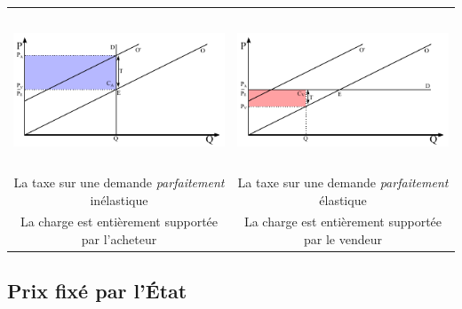 \begin{center}
\begin{tabular}{cc}
		\rule[-0.9cm]{0cm}{0.5cm}\\
		
		\includegraphics[height=4.5cm]{images/graph_taxe_demande_parfaitement_inelastique.pdf} & \includegraphics[height=4.5cm]{images/graph_taxe_demande_parfaitement_elastique.pdf}\\
		La taxe sur une demande \textit{parfaitement} inélastique                              & La taxe sur une demande \textit{parfaitement} élastique\\
		La charge est entièrement supportée par l'acheteur                                   & La charge est entièrement supportée par le vendeur\\
	\end{tabular}
\end{center}



\subsection{Prix fixé par l'État}


